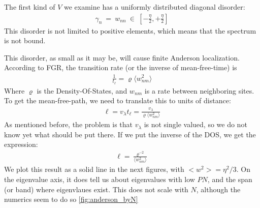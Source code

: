 \documentclass[onecolumn,fleqn,longbibliography]{revtex4}
\begin{document}
The first kind of $V$ we examine has a uniformly distributed diagonal disorder:
\begin{align}
\gamma_n  \ = \  w_{nn} \ \in \ \left[-\frac{\eta}{2},+\frac{\eta}{2} \right]
\end{align}
{This disorder is not limited to positive elements},
which means that the spectrum is not bound.


This disorder, as small as it may be, will cause finite Anderson localization.
According to FGR, the transition rate (or the inverse of mean-free-time) is
\begin{align}
\frac{1}{t_\ell} = \varrho \langle w_{nm}^2\rangle
\end{align}
Where $\varrho$ is the Density-Of-States, and $w_{nm}$ is a rate between
neighboring sites.
To get the mean-free-path, we need to translate this to units of distance:
\begin{align}
\ell = v_\lambda t_\ell = \frac{v_\lambda}{\varrho \langle w_{nm}^2\rangle}
\end{align}
As mentioned before, the problem is that $v_\lambda$ is not single valued,
so we do not know yet what should be put there. If we put the inverse of 
the DOS, we get the expression:
\begin{align}
\ell = \frac{\varrho^{-2}}{ \langle w_{nm}^2\rangle}
\end{align}
We plot this result as a solid line in the next figures, with $<w^2> = \eta^2/3$.
On the eigenvalue axis, it does tell us about eigenvalues with low $PN$,
and the span (or band) where eigenvlaues exist. This does not scale with $N$, although 
the numerics seem to do so \autoref{fig:anderson_byN}
\end{document}
